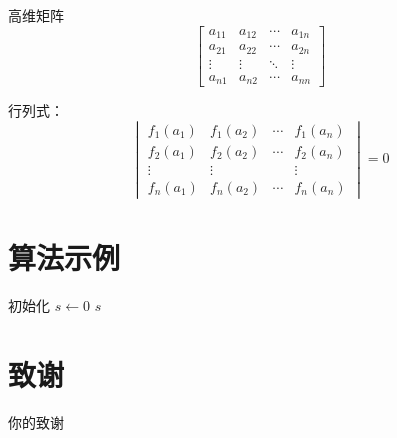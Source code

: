 \documentclass[a4paper,AutoFakeBold={2.7},UTF8,zihao=5,twoside]{ctexart} %
\numberwithin{equation}{section}%
\begin{document}
高维矩阵
\begin{equation}
	\begin{bmatrix}
		a_{11} & a_{12} & \cdots & a_{1n} \\
		a_{21} & a_{22} & \cdots & a_{2n} \\
		\vdots & \vdots & \ddots & \vdots \\
		a_{n1} & a_{n2} & \cdots & a_{nn}
	\end{bmatrix}
\end{equation}

行列式：
\begin{equation}
  \begin{vmatrix}
    f_1(a_1) & f_1(a_2) & \cdots & f_1(a_n) \\
    f_2(a_1) & f_2(a_2) & \cdots & f_2(a_n) \\
    \vdots   & \vdots   &        & \vdots   \\
    f_n(a_1) & f_n(a_2) & \cdots & f_n(a_n)
  \end{vmatrix}
  = 0
\end{equation}

\clearpage

\section{算法示例}

\begin{algorithm}
\caption{累加求和算法}

初始化 $s \gets 0$\;
\Return $s$\;
\end{algorithm}

\clearpage

\printbibliography[heading=centeredBib, title=参考文献]%
\clearpage

\section*{致谢}

你的致谢

\clearpage

\appendix
{}%
\end{document}
